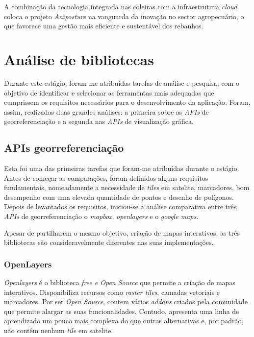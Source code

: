 A combinação da tecnologia integrada nas coleiras com a infraestrutura \textit{cloud} coloca o projeto \textit{Aniposture} na vanguarda da inovação no sector agropecuário, o que favorece uma gestão mais eficiente e sustentável dos rebanhos.

\section{Análise de bibliotecas}\label{sec:analysis}
Durante este estágio, foram-me atribuídas tarefas de análise e pesquisa, com o objetivo de identificar e selecionar as ferramentas mais adequadas que cumprissem os requisitos necessários para o desenvolvimento da aplicação. Foram, assim, realizadas duas grandes análises: a primeira sobre as \textit{APIs} de georreferenciação e a segunda nas \textit{APIs} de visualização gráfica.

\subsection{APIs georreferenciação} %
Esta foi uma das primeiras tarefas que foram-me atribuídas durante o estágio. Antes de começar as comparações, foram definidos alguns requisitos fundamentais, nomeadamente a necessidade de \textit{tiles} em satelite, marcadores, bom desempenho com uma elevada quantidade de pontos e desenho de polígonos. Depois de levantados os requisitos, iniciou-se a análise comparativa entre três \textit{APIs} de georreferenciação o \textit{mapbox}, \textit{openlayers} e o \textit{google maps}.

Apesar de partilharem o mesmo objetivo, criação de mapas interativos, as três bibliotecas são consideravelmente diferentes nas suas implementações. 

\subsubsection{\textbf{OpenLayers}}\label{sec:sub_ol} 

\textit{Openlayers} é o biblioteca \textit{free e Open Source} que permite a criação de mapas interativos. Disponibiliza recursos como \textit{raster tiles}, camadas vetoriais e marcadores. Por ser \textit{Open Source}, contem vários \textit{addons} criados pela comunidade que permite alargar as suas funcionalidades. Contudo, apresenta uma linha de aprendizado um pouco mais complexa do que outras alternativas e, por padrão, não contêm  nenhum \textit{tile} em satelite. 

